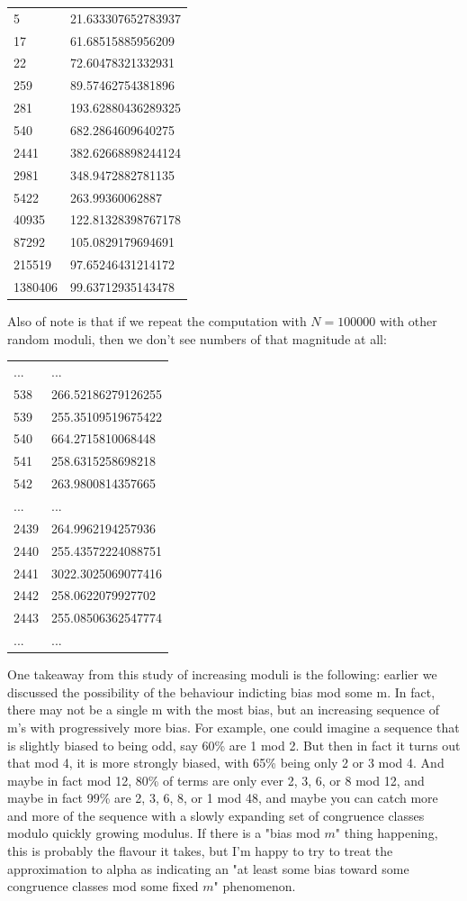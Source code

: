 \documentclass{article}
\theoremstyle{definition}
\theoremstyle{remark}
\numberwithin{equation}{section}
\begin{document}
{\begin{tabular}{ll}
5 & 21.633307652783937\\
17 & 61.68515885956209\\
22 & 72.60478321332931\\
259 & 89.57462754381896\\
281 & 193.62880436289325\\
540 & 682.2864609640275\\
2441 & 382.62668898244124\\
2981 & 348.9472882781135\\
5422 & 263.99360062887\\
40935 & 122.81328398767178\\
87292 & 105.0829179694691\\
215519 & 97.65246431214172\\
1380406 & 99.63712935143478
\end{tabular}

Also of note is that if we repeat the computation with $N=100000$ with
other random moduli, then we don't see numbers of that magnitude at
all:

\begin{tabular}{ll}
...&...\\
538 & 266.52186279126255\\
539 & 255.35109519675422\\
540 & 664.2715810068448\\
541 & 258.6315258698218\\
542 & 263.9800814357665\\
...&...\\
2439 & 264.9962194257936\\
2440 & 255.43572224088751\\
2441 & 3022.3025069077416\\
2442 & 258.0622079927702\\
2443 & 255.08506362547774\\
...&...\\
\end{tabular}

One takeaway from this study of increasing moduli is the following:
earlier we discussed the possibility of the behaviour indicting bias
mod some m.  In fact, there may not be a single m with the most bias,
but an increasing sequence of m's with progressively more bias.  For
example, one could imagine a sequence that is slightly biased to being
odd, say 60\% are 1 mod 2.  But then in fact it turns out that mod 4,
it is more strongly biased, with 65\% being only 2 or 3 mod 4.  And
maybe in fact mod 12, 80\% of terms are only ever 2, 3, 6, or 8 mod 12,
and maybe in fact 99\% are 2, 3, 6, 8, or 1 mod 48, and maybe you can
catch more and more of the sequence with a slowly expanding set of
congruence classes modulo quickly growing modulus.  If there is a
"bias mod $m$" thing happening, this is probably the flavour it takes,
but I'm happy to try to treat the approximation to alpha as indicating
an "at least some bias toward some congruence classes mod some fixed
$m$" phenomenon.

}
\end{document}
